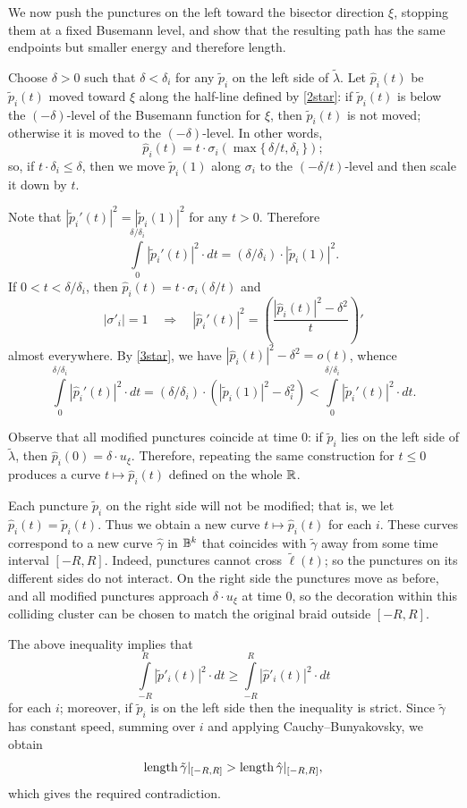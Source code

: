 \documentclass[a4paper,10pt]{article}
\begin{document}
We now push the punctures on the left toward the bisector direction $\xi$, stopping them at a fixed Busemann level, and show that the resulting path has the same endpoints but smaller energy and therefore length.

Choose $\delta>0$ such that $\delta<\delta_i$ for any $\tilde p_i$ on the left side of $\tilde \lambda$.
Let $\hat p_i(t)$ be $\tilde p_i(t)$ moved toward $\xi$ along the half-line defined by \ref{2star}:
if $\tilde p_i(t)$ is below the $(-\delta)$-level of the Busemann function for $\xi$, then $\tilde p_i(t)$ is not moved;
otherwise it is moved to the $(-\delta)$-level.
In other words, \[\hat p_i(t)=t\cdot \sigma_i(\max\{\,\delta/t, \delta_i\,\});\]
so, if $t\cdot \delta_i\le \delta$, then
we move $\tilde p_i(1)$ along $\sigma_i$ to the $(-\delta/t)$-level and then scale it down by $t$.

Note that $|\tilde p_i'(t)|^2=|\tilde p_i(1)|^2$ for any $t>0$.
Therefore
\[\int\limits_{0}^{\delta/\delta_i}|\tilde p_i'(t)|^2\cdot dt
=
(\delta/\delta_i)\cdot|\tilde p_i(1)|^2.\]
If $0<t<\delta/\delta_i$, then $\hat p_i(t)=t\cdot \sigma_i(\delta/t)$
and
\[|\sigma'_i|=1
\quad\Rightarrow\quad
|\hat p_i'(t)|^2=\left(\frac{|\hat p_i(t)|^2-\delta^2}{t}\right)'\]
almost everywhere.
By \ref{3star}, we have $|\hat p_i(t)|^2-\delta^2=o(t)$, whence
\[\int\limits_0^{\delta/\delta_i}|\hat p_i'(t)|^2\cdot dt
=
(\delta/\delta_i)\cdot(|\tilde p_i(1)|^2-\delta_i^2)
<
\int\limits_0^{\delta/\delta_i}|\tilde p_i'(t)|^2\cdot dt.\]

Observe that all modified punctures coincide at time $0$: if $\tilde p_i$ lies on the left side of $\tilde\lambda$, then $\hat p_i(0)=\delta\cdot u_\xi$.
Therefore, repeating the same construction for $t\le 0$ produces a curve $t\mapsto \hat p_i(t)$ defined on the whole $\mathbb{R}$.

Each puncture $\tilde p_i$ on the right side will not be modified;
that is, we let $\hat p_i(t)=\tilde p_i(t)$.
Thus we obtain a new curve $t\mapsto \hat p_i(t)$ for each $i$.
These curves correspond to a new curve $\hat\gamma$ in $\mathbb{B}^k$ that coincides with $\tilde \gamma$ away from some time interval $[-R,R]$.
Indeed, punctures cannot cross $\tilde\ell(t)$; so the punctures on its different sides do not interact.
On the right side the punctures move as before,
and all modified punctures approach $\delta\cdot u_\xi$ at time $0$,
so the decoration within this colliding cluster can be chosen to match the original braid outside $[-R,R]$.

The above inequality implies that
\[\int\limits_{-R}^{R}|\tilde p'_i(t)|^2\cdot dt
\ge
\int\limits_{-R}^{R}|\hat p'_i(t)|^2\cdot dt\]
for each $i$; moreover, if $\tilde p_i$ is on the left side then the inequality is strict.
Since $\tilde\gamma$ has constant speed,
summing over $i$ and applying Cauchy--Bunyakovsky, we obtain
\[\mathop{\rm length}\nolimits \tilde\gamma|_{[-R,R]}>\mathop{\rm length}\nolimits\hat\gamma|_{[-R,R]},\]
which gives the required contradiction.
\end{document}
